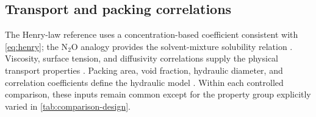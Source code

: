 
\subsection{Transport and packing correlations}
The Henry-law reference uses a concentration-based coefficient consistent with \cref{eq:henry}; the N$_2$O analogy provides the solvent-mixture solubility relation \cite{Jiru2012}.
Viscosity, surface tension, and diffusivity correlations supply the physical transport properties \cite{Morgan2015}.
Packing area, void fraction, hydraulic diameter, and correlation coefficients define the hydraulic model \cite{Billet1999,Tsai2010,Chinen2018}.
Within each controlled comparison, these inputs remain common except for the property group explicitly varied in \cref{tab:comparison-design}.

